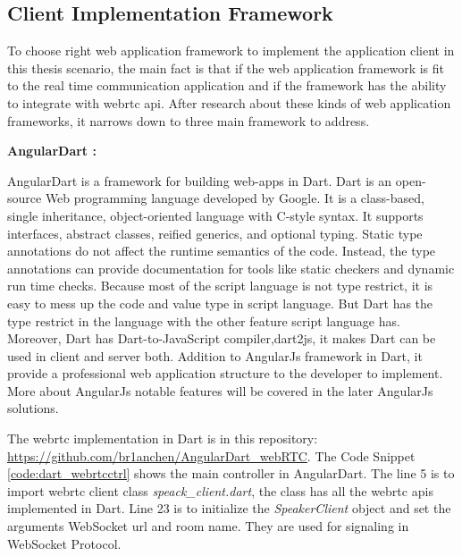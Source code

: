 \subsection{Client Implementation Framework}

\noindent To choose right web application framework to implement the application client in this thesis scenario, the main fact is that if the web  application framework is fit to the real time communication application and if the framework has the ability to integrate with \gls{webrtc} \gls{api}. After research about these kinds of web application frameworks, it narrows down to three main framework to address.

\textbf{AngularDart :}

\par AngularDart is a framework for building web-apps in Dart. Dart is an open-source Web programming language developed by Google. It is a class-based, single inheritance, object-oriented language with C-style syntax. It supports interfaces, abstract classes, reified generics, and optional typing. Static type annotations do not affect the runtime semantics of the code. Instead, the type annotations can provide documentation for tools like static checkers and dynamic run time checks.\cite{wiki:dart} Because most of the script language is not type restrict, it is easy to mess up the code and value type in script language. But Dart has the type restrict in the language with the other feature script language has. Moreover, Dart has Dart-to-JavaScript compiler,dart2js, it makes Dart can be used in client and server both. Addition to AngularJs framework in Dart, it provide a professional web application structure to the developer to implement. More about AngularJs notable features will be covered in the later AngularJs solutions. 

\par The \gls{webrtc} implementation in Dart is in this repository: \url{https://github.com/br1anchen/AngularDart_webRTC}. The Code Snippet \ref{code:dart_webrtcctrl} shows the main controller in AngularDart. The line 5 is to import \gls{webrtc} client class \textit{speack\_client.dart}, the class has all the \gls{webrtc} \gls{api}s implemented in Dart. Line 23 is to initialize the \textit{SpeakerClient} object and set the arguments WebSocket url and room name. They are used for signaling in WebSocket Protocol.

